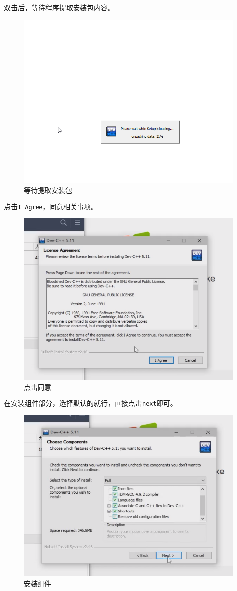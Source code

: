 双击后，等待程序提取安装包内容。
\begin{figure}[H]
\centering
\includegraphics[width=0.6\linewidth]{01chapter/img/dev安装02}
\caption{等待提取安装包}
\label{fig:dev02}
\end{figure}
点击\texttt{I Agree}，同意相关事项。
\begin{figure}[H]
\centering
\includegraphics[width=0.6\linewidth]{01chapter/img/dev安装03}
\caption{点击同意}
\label{fig:dev03}
\end{figure}
在安装组件部分，选择默认的就行，直接点击\texttt{next}即可。
\begin{figure}[H]
\centering
\includegraphics[width=0.6\linewidth]{01chapter/img/dev安装04}
\caption{安装组件}
\label{fig:dev04}
\end{figure}
